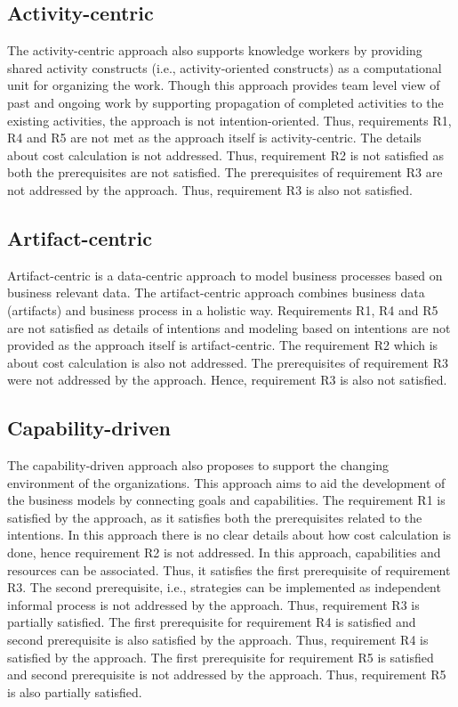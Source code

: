 \subsection{Activity-centric} 
The activity-centric approach also supports knowledge workers by providing shared activity constructs (i.e., activity-oriented constructs) as a computational unit for organizing the work. Though this approach provides team level view of past and ongoing work by supporting propagation of completed activities to the existing activities, the approach is not intention-oriented. Thus, requirements R1, R4 and R5 are not met as the approach itself is activity-centric. The details about cost calculation is not addressed. Thus, requirement R2 is not satisfied as both the prerequisites are not satisfied. The prerequisites of requirement R3 are not addressed by the approach. Thus, requirement R3 is also not satisfied.   
 
\subsection{Artifact-centric} 
Artifact-centric is a data-centric approach to model business processes based on business relevant data. The artifact-centric approach combines business data (artifacts) and business process in a holistic way. Requirements R1, R4 and R5 are not satisfied as details of intentions and modeling based on intentions are not provided as the approach itself is artifact-centric. The requirement R2 which is about cost calculation is also not addressed. The prerequisites of requirement R3 were not addressed by the approach. Hence, requirement R3 is also not satisfied. 

\subsection{Capability-driven} 
The capability-driven approach also proposes to support the changing environment of the organizations. This approach aims to aid the development of the  business models by connecting goals and capabilities. The requirement R1 is satisfied by the approach, as it satisfies both the prerequisites related to the intentions. In this approach there is no clear details about how cost calculation is done, hence requirement R2 is not addressed. In this approach, capabilities and resources can be associated. Thus, it satisfies the first prerequisite of requirement R3. The second prerequisite, i.e., strategies can be implemented as independent informal process is not addressed by the approach. Thus, requirement R3 is partially satisfied. The first prerequisite for requirement R4 is satisfied and second prerequisite is also satisfied by the approach. Thus, requirement R4 is satisfied by the approach. The first prerequisite for requirement R5 is satisfied and second prerequisite is not addressed by the approach. Thus, requirement R5 is also partially satisfied. 

